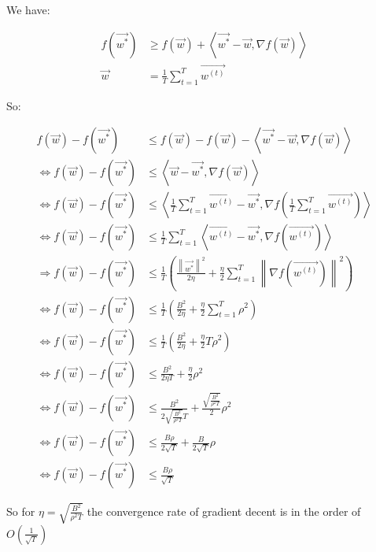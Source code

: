 
We have:

\begin{align*}
    f\left( \vec{w^{*}} \right) &\geqslant f\left( \vec{w} \right) + \left< \vec{w^{*}} - \vec{w} , \nabla f\left( \vec{w} \right) \right> \\
    \vec{w} &= \frac{1}{T} \sum^{T}_{t=1} \vec{w^{(t)}}
\end{align*}

So:

\begin{align*}
    f\left( \vec{w} \right) - f\left( \vec{w^{*}} \right) &\leqslant
    f\left( \vec{w} \right) - f\left( \vec{w} \right) - \left< \vec{w^{*}} - \vec{w} , \nabla f\left( \vec{w} \right) \right>
    \\
    \Leftrightarrow
    f\left( \vec{w} \right) - f\left( \vec{w^{*}} \right) &\leqslant
    \left< \vec{w} - \vec{w^{*}}, \nabla f\left( \vec{w} \right) \right>
    \\
    \Leftrightarrow
    f\left( \vec{w} \right) - f\left( \vec{w^{*}} \right) &\leqslant
    \left< \frac{1}{T} \sum^{T}_{t=1} \vec{w^{(t)}} - \vec{w^{*}} , \nabla f\left( \frac{1}{T} \sum^{T}_{t=1} \vec{w^{(t)}} \right) \right>
    \\
    \Leftrightarrow
    f\left( \vec{w} \right) - f\left( \vec{w^{*}} \right) &\leqslant
    \frac{1}{T} \sum^{T}_{t=1} \left< \vec{w^{(t)}} -  \vec{w^{*}}, \nabla f\left( \vec{w^{(t)}} \right) \right>
    \\
    \Rightarrow
    f\left( \vec{w} \right) - f\left( \vec{w^{*}} \right) &\leqslant
    \frac{1}{T} \left( \frac{\left\| \vec{w^*} \right\|^2}{2 \eta} + \frac{\eta}{2} \sum^{T}_{t=1} \left\| \nabla f\left( \vec{w^{(t)}} \right) \right\|^2 \right)
    \\
    \Leftrightarrow
    f\left( \vec{w} \right) - f\left( \vec{w^{*}} \right) &\leqslant
    \frac{1}{T} \left( \frac{B^2}{2 \eta} + \frac{\eta}{2} \sum^{T}_{t=1} \rho^2 \right)
    \\
    \Leftrightarrow
    f\left( \vec{w} \right) - f\left( \vec{w^{*}} \right) &\leqslant
    \frac{1}{T} \left( \frac{B^2}{2 \eta} + \frac{\eta}{2} T \rho^2 \right)
    \\
    \Leftrightarrow
    f\left( \vec{w} \right) - f\left( \vec{w^{*}} \right) &\leqslant
    \frac{B^2}{2 \eta T} + \frac{\eta}{2} \rho^2
    \\
    \Leftrightarrow
    f\left( \vec{w} \right) - f\left( \vec{w^{*}} \right) &\leqslant
    \frac{B^2}{2 \sqrt{\frac{B^2}{\rho^2 T}} T} + \frac{\sqrt{\frac{B^2}{\rho^2 T}}}{2} \rho^2
    \\
    \Leftrightarrow
    f\left( \vec{w} \right) - f\left( \vec{w^{*}} \right) &\leqslant
    \frac{B \rho}{2 \sqrt{T}} + \frac{B}{2\sqrt{T}} \rho
    \\
    \Leftrightarrow
    f\left( \vec{w} \right) - f\left( \vec{w^{*}} \right) &\leqslant
    \frac{B \rho}{\sqrt{T}}
\end{align*}

So for $\eta = \sqrt{\frac{B^2}{\rho^2 T}}$ the convergence rate of gradient decent is in the order of $O\left( \frac{1}{\sqrt{T}} \right)$
